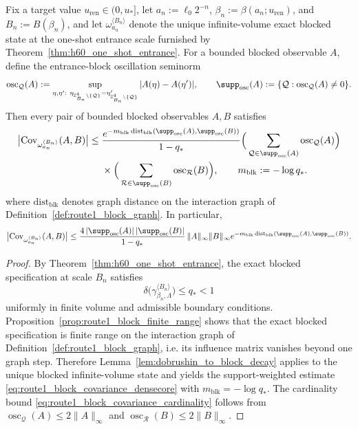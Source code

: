 \begin{proposition}
\label{prop:route1_block_covariance}
Fix a target value $u_{\mathrm{ren}}\in(0,u_\ast]$, let $a_n:=\ell_0 2^{-n}$, $\beta_n:=\beta(a_n;u_{\mathrm{ren}})$, and $B_n:=B(\beta_n)$, and let $\omega_{a_n}^{\langle B_n\rangle}$ denote the unique infinite-volume exact blocked state at the one-shot entrance scale furnished by Theorem~\ref{thm:h60_one_shot_entrance}.
For a bounded blocked observable $A$, define the entrance-block oscillation seminorm
\[
\operatorname{osc}_{\mathcal Q}(A):=
\sup_{\eta,\eta':\ \eta_{\mathbb Z^4_{B_n}\setminus\{\mathcal Q\}}=\eta'_{\mathbb Z^4_{B_n}\setminus\{\mathcal Q\}}}
|A(\eta)-A(\eta')|,
\qquad
\supp_{\mathrm{osc}}(A):=\{\mathcal Q:\operatorname{osc}_{\mathcal Q}(A)\neq0\}.
\]
Then every pair of bounded blocked observables $A,B$ satisfies
\begin{equation}\label{eq:route1_block_covariance_densecore}
\begin{aligned}
\big|\mathrm{Cov}_{\omega_{a_n}^{\langle B_n\rangle}}(A,B)\big|
\le{}&\frac{e^{-m_{\mathrm{blk}}\,\mathrm{dist}_{\mathrm{blk}}(\supp_{\mathrm{osc}}(A),\supp_{\mathrm{osc}}(B))}}{1-q_\ast}
\Big(\sum_{\mathcal Q\in\supp_{\mathrm{osc}}(A)}\operatorname{osc}_{\mathcal Q}(A)\Big)\\
&\times\Big(\sum_{\mathcal R\in\supp_{\mathrm{osc}}(B)}\operatorname{osc}_{\mathcal R}(B)\Big),
\qquad m_{\mathrm{blk}}:=-\log q_\ast.
\end{aligned}
\end{equation}
where $\mathrm{dist}_{\mathrm{blk}}$ denotes graph distance on the interaction graph of Definition~\ref{def:route1_block_graph}.
In particular,
\begin{equation}\label{eq:route1_block_covariance_cardinality}
\big|\mathrm{Cov}_{\omega_{a_n}^{\langle B_n\rangle}}(A,B)\big|
\le
\frac{4\,|\supp_{\mathrm{osc}}(A)|\,|\supp_{\mathrm{osc}}(B)|}{1-q_\ast}\,
\|A\|_\infty\|B\|_\infty
 e^{-m_{\mathrm{blk}}\,\mathrm{dist}_{\mathrm{blk}}(\supp_{\mathrm{osc}}(A),\supp_{\mathrm{osc}}(B))}.
\end{equation}
\end{proposition}

\begin{proof}
By Theorem~\ref{thm:h60_one_shot_entrance}, the exact blocked specification at scale $B_n$ satisfies
\[
\delta\bigl(\gamma^{\langle B_n\rangle}_{\beta_n,\Lambda}\bigr)\le q_\ast<1
\]
uniformly in finite volume and admissible boundary conditions.
Proposition~\ref{prop:route1_block_finite_range} shows that the exact blocked specification is finite range on the interaction graph of Definition~\ref{def:route1_block_graph}, i.e. its influence matrix vanishes beyond one graph step.
Therefore Lemma~\ref{lem:dobrushin_to_block_decay} applies to the unique blocked infinite-volume state and yields the support-weighted estimate \eqref{eq:route1_block_covariance_densecore} with $m_{\mathrm{blk}}=-\log q_\ast$.
The cardinality bound \eqref{eq:route1_block_covariance_cardinality} follows from $\operatorname{osc}_{\mathcal Q}(A)\le 2\|A\|_\infty$ and $\operatorname{osc}_{\mathcal R}(B)\le 2\|B\|_\infty$.
\end{proof}



